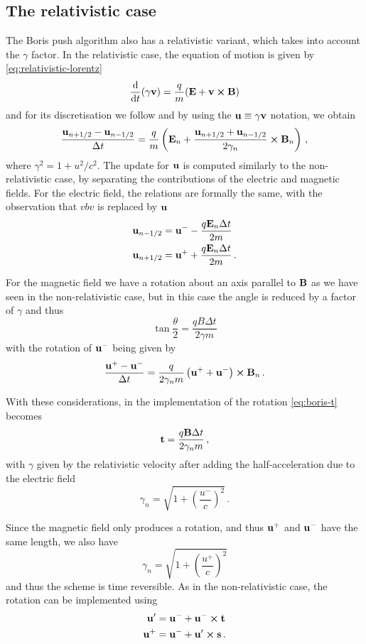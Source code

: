 \documentclass[12pt, class=report, crop=false]{standalone}
\begin{document}

\subsection{The relativistic case}

The Boris push algorithm also has a relativistic variant, which takes into account
the \(\gamma\) factor.
In the relativistic case, the equation of motion is given by
\cref{eq:relativistic-lorentz}
\[
\dv{t}(\gamma \vb{v}) = \frac{q}{m} (\vb{E} + \vb{v}\cp\vb{B})
\]
and for its discretisation we follow \textcite[Section 15-4]{birdsall_plasmaphysics_2005} and by using the
\(\vb{u}\equiv\gamma\vb{v}\) notation, we obtain
\[
\frac{\vb{u}_{n+1/2} -\vb{u}_{n-1/2}}{\Delta t} =
\frac{q}{m}\left(\vb{E}_n + \frac{\vb{u}_{n+1/2}+\vb{u}_{n-1/2}}{2\gamma_n} \cp \vb{B}_n \right)\,,
\]
where \(\gamma^2=1+u^2/c^2\). The update for \(\vb{u}\) is
computed similarly to the non-relativistic case, by separating
the contributions of the electric and magnetic fields.
For the electric field, the relations are formally the same,
with the observation that \(vb{v}\) is replaced by \(\vb{u}\)
\[
\begin{aligned}
  \vb{u}_{n-1/2} &= \vb{u}^- - \frac{q\vb{E}_n \Delta t}{2m} \\
  \vb{u}_{n+1/2} &= \vb{u}^+ + \frac{q\vb{E}_n \Delta t}{2m}\,.
\end{aligned}
\]

For the magnetic field we have a rotation about an axis parallel to \(\vb{B}\)
as we have seen in the non-relativistic case, but in this case
the angle is reduced by a factor of \(\gamma\) and thus
\[
\tan{\frac{\theta}{2}} = \frac{q B \Delta t}{2\gamma m}
\]
with the rotation of \(\vb{u}^-\) being given by
\[
\frac{\vb{u}^+ - \vb{u}^-}{\Delta t} = \frac{q}{2\gamma_n m}
\left(\vb{u}^+ + \vb{u}^-\right)\cp\vb{B}_n\,.
\]

With these considerations, in the implementation of the rotation \cref{eq:boris-t} becomes
\[
\vb{t} = \frac{q \vb{B} \Delta t}{2 \gamma_n m}\,,
\]
with \(\gamma\) given by the relativistic velocity after adding the half-acceleration due to the electric field
\[
\gamma_n = \sqrt{1+{\left(\frac{u^-}{c}\right)}^2}\,.
\]

Since the magnetic field only produces a rotation, and thus
\(\vb{u}^+\) and \(\vb{u}^-\) have the same length, we also
have
\[
\gamma_n = \sqrt{1+{\left(\frac{u^+}{c}\right)}^2}
\]
and thus the scheme is time reversible.
As in the non-relativistic case, the rotation can be implemented using
\[
\begin{aligned}
  \vb{u}' &= \vb{u}^- + \vb{u}^-\cp\vb{t} \\
  \vb{u}^+ &= \vb{u}^- + \vb{u}'\cp\vb{s}\,.
\end{aligned}
\]
\end{document}
